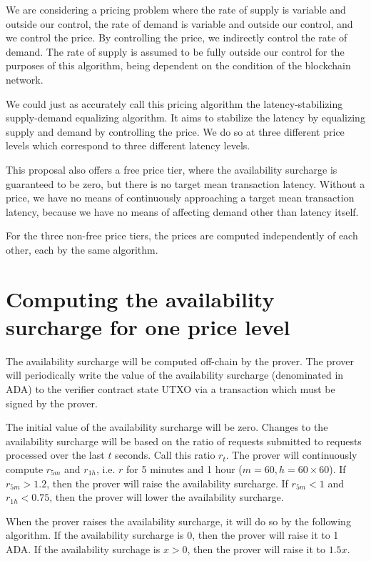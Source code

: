 \documentclass[12pt]{article}
\begin{document}
We are considering a pricing problem where the rate of supply is variable and outside our control, the rate of demand is variable and outside our control, and we control the price. By controlling the price, we indirectly control the rate of demand. The rate of supply is assumed to be fully outside our control for the purposes of this algorithm, being dependent on the condition of the blockchain network.

We could just as accurately call this pricing algorithm the latency-stabilizing supply-demand equalizing algorithm. It aims to stabilize the latency by equalizing supply and demand by controlling the price. We do so at three different price levels which correspond to three different latency levels.

This proposal also offers a free price tier, where the availability surcharge is guaranteed to be zero, but there is no target mean transaction latency. Without a price, we have no means of continuously approaching a target mean transaction latency, because we have no means of affecting demand other than latency itself.

For the three non-free price tiers, the prices are computed independently of each other, each by the same algorithm.

\section{Computing the availability surcharge for one price level}

The availability surcharge will be computed off-chain by the prover. The prover will periodically write the value of the availability surcharge (denominated in ADA) to the verifier contract state UTXO via a transaction which must be signed by the prover.

The initial value of the availability surcharge will be zero. Changes to the availability surcharge will be based on the ratio of requests submitted to requests processed over the last $t$ seconds. Call this ratio $r_t$. The prover will continuously compute $r_{5m}$ and $r_{1h}$, i.e. $r$ for 5 minutes and 1 hour ($m = 60, h = 60 \times 60$). If $r_{5m} > 1.2$, then the prover will raise the availability surcharge. If $r_{5m} < 1$ and $r_{1h} < 0.75$, then the prover will lower the availability surcharge.

When the prover raises the availability surcharge, it will do so by the following algorithm. If the availability surcharge is 0, then the prover will raise it to 1 ADA. If the availability surchage is $x > 0$, then the prover will raise it to $1.5x$.
\end{document}
